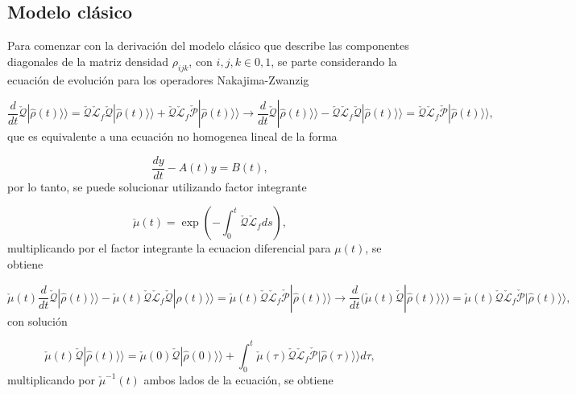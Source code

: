 \begin{appendixs}
\label{appendix5final}

\subsection{Modelo clásico}
Para comenzar con la derivación del modelo clásico que describe las componentes diagonales de la matriz densidad $\rho_{ijk}$, con $i,j,k \in {0,1}$, se parte considerando la ecuación de evolución para los operadores Nakajima-Zwanzig

\begin{equation*}
    \frac{d}{dt}\check{\mathcal{Q}}|\hat{\rho}(t)\rangle \rangle = \check{\mathcal{Q}}\check{\mathcal{L}}_{f}\check{\mathcal{Q}}|\hat{\rho}(t)\rangle \rangle + \check{\mathcal{Q}}\check{\mathcal{L}}_{f}\check{\mathcal{P}}|\hat{\rho}(t)\rangle \rangle \to \frac{d}{dt}\check{\mathcal{Q}}|\hat{\rho}(t)\rangle \rangle - \check{\mathcal{Q}}\check{\mathcal{L}}_{f}\check{\mathcal{Q}}|\hat{\rho}(t)\rangle \rangle = \check{\mathcal{Q}}\check{\mathcal{L}}_{f}\check{\mathcal{P}}|\hat{\rho}(t)\rangle \rangle ,
\end{equation*}
que es equivalente a una ecuación no homogenea lineal de la forma

\begin{equation*}
    \frac{dy}{dt} - A(t)y = B(t),
\end{equation*}
por lo tanto, se puede solucionar utilizando factor integrante

\begin{equation*}
    \check{\mu}(t) = \exp\left( - \int_{0}^{t}\check{\mathcal{Q}}\check{\mathcal{L}}_{f}ds \right),
\end{equation*}
multiplicando por el factor integrante la ecuacion diferencial para $\mu(t)$, se obtiene 

\begin{equation*}
    \check{\mu}(t)\frac{d}{dt}\check{\mathcal{Q}}|\hat{\rho}(t)\rangle \rangle - \check{\mu}(t)\check{\mathcal{Q}}\check{\mathcal{L}}_{f}\check{\mathcal{Q}}|\hat{\rho}(t)\rangle \rangle  = \check{\mu}(t)\check{\mathcal{Q}}\check{\mathcal{L}}_{f}\check{\mathcal{P}}|\hat{\rho}(t)\rangle \rangle  \to \frac{d}{dt}(\check{\mu}(t)\check{\mathcal{Q}}|\hat{\rho}(t)\rangle \rangle) = \check{\mu}(t)\check{\mathcal{Q}}\check{\mathcal{L}}_{f}\check{\mathcal{P}}|\hat{\rho}(t)\rangle \rangle ,
\end{equation*}
con solución

\begin{equation*}
    \check{\mu}(t)\check{\mathcal{Q}}|\hat{\rho}(t)\rangle \rangle  = \check{\mu}(0)\check{\mathcal{Q}}|\hat{\rho}(0)\rangle \rangle  + \int_{0}^{t}\check{\mu}(\tau)\check{\mathcal{Q}}\check{\mathcal{L}}_{f} \check{\mathcal{P}}|\hat{\rho}(\tau)\rangle \rangle d\tau,   
\end{equation*}
multiplicando por $\check{\mu}^{-1}(t)$ ambos lados de la ecuación, se obtiene


\end{appendixs}

